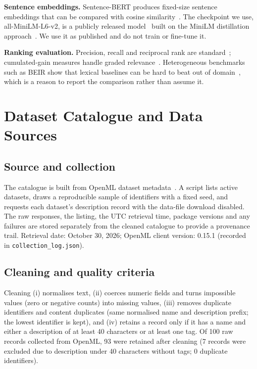\documentclass[conference]{IEEEtran}
\begin{document}
\textbf{Sentence embeddings.} Sentence-BERT produces fixed-size sentence embeddings that can be compared with cosine similarity~\cite{reimers2019sbert}. The checkpoint we use, all-MiniLM-L6-v2, is a publicly released model~\cite{minilmcard} built on the MiniLM distillation approach~\cite{wang2020minilm}. We use it as published and do not train or fine-tune it.

\textbf{Ranking evaluation.} Precision, recall and reciprocal rank are standard~\cite{manning2008irbook}; cumulated-gain measures handle graded relevance~\cite{jarvelin2002cumulated}. Heterogeneous benchmarks such as BEIR show that lexical baselines can be hard to beat out of domain~\cite{thakur2021beir}, which is a reason to report the comparison rather than assume it.

\section{Dataset Catalogue and Data Sources}
\subsection{Source and collection}
The catalogue is built from OpenML dataset metadata~\cite{openmldocs}. A script lists active datasets, draws a reproducible sample of identifiers with a fixed seed, and requests each dataset's description record with the data-file download disabled. The raw responses, the listing, the UTC retrieval time, package versions and any failures are stored separately from the cleaned catalogue to provide a provenance trail. Retrieval date: October 30, 2026; OpenML client version: 0.15.1 (recorded in \texttt{collection\_log.json}).

\subsection{Cleaning and quality criteria}
Cleaning (i) normalises text, (ii) coerces numeric fields and turns impossible values (zero or negative counts) into missing values, (iii) removes duplicate identifiers and content duplicates (same normalised name and description prefix; the lowest identifier is kept), and (iv) retains a record only if it has a name and either a description of at least 40 characters or at least one tag. Of 100 raw records collected from OpenML, 93 were retained after cleaning (7 records were excluded due to description under 40 characters without tags; 0 duplicate identifiers).
\end{document}
